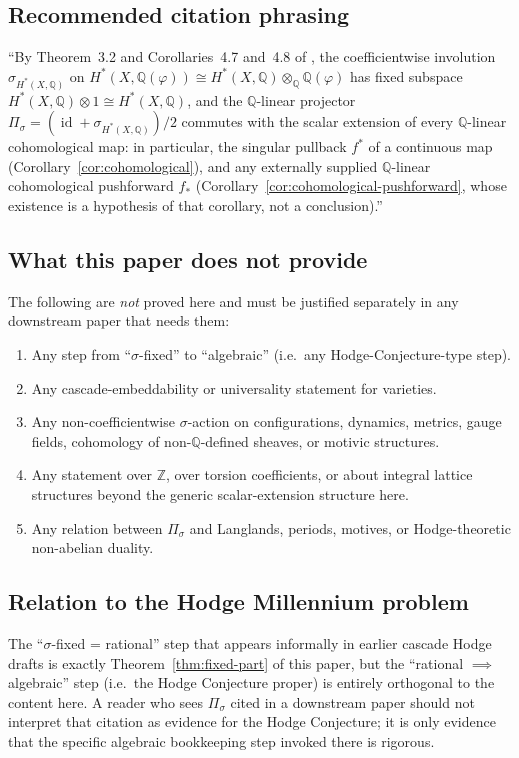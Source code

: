 \documentclass[11pt, a4paper]{amsart}
\theoremstyle{definition}
\newcommand{\Q}{\mathbb{Q}}
\newcommand{\Z}{\mathbb{Z}}
\newcommand{\id}{\operatorname{id}}
\begin{document}
\subsection{Recommended citation phrasing}

``By Theorem~3.2 and Corollaries~4.7 and~4.8 of
\cite{SigmaRationality}, the coefficientwise involution
$\sigma_{H^*(X, \Q)}$ on $H^*(X, \Q(\varphi)) \cong H^*(X, \Q)
\otimes_\Q \Q(\varphi)$ has fixed subspace $H^*(X, \Q) \otimes 1
\cong H^*(X, \Q)$, and the $\Q$-linear projector $\Pi_\sigma =
(\id + \sigma_{H^*(X, \Q)})/2$ commutes with the scalar extension
of every $\Q$-linear cohomological map: in particular, the singular
pullback $f^*$ of a continuous map (Corollary~\ref{cor:cohomological}),
and any externally supplied $\Q$-linear cohomological pushforward
$f_*$ (Corollary~\ref{cor:cohomological-pushforward}, whose
existence is a hypothesis of that corollary, not a conclusion).''

\subsection{What this paper does not provide}

The following are \emph{not} proved here and must be justified
separately in any downstream paper that needs them:

\begin{enumerate}
\item Any step from ``$\sigma$-fixed'' to ``algebraic'' (i.e.\ any
  Hodge-Conjecture-type step).
\item Any cascade-embeddability or universality statement for
  varieties.
\item Any non-coefficientwise $\sigma$-action on configurations,
  dynamics, metrics, gauge fields, cohomology of non-$\Q$-defined
  sheaves, or motivic structures.
\item Any statement over $\Z$, over torsion coefficients, or about
  integral lattice structures beyond the generic scalar-extension
  structure here.
\item Any relation between $\Pi_\sigma$ and Langlands, periods,
  motives, or Hodge-theoretic non-abelian duality.
\end{enumerate}

\subsection{Relation to the Hodge Millennium problem}

The ``$\sigma$-fixed = rational'' step that appears informally in
earlier cascade Hodge drafts is exactly
Theorem~\ref{thm:fixed-part} of this paper, but the ``rational
$\implies$ algebraic'' step (i.e.\ the Hodge Conjecture proper) is
entirely orthogonal to the content here. A reader who sees $\Pi_\sigma$ cited in a downstream paper
should not interpret that citation as evidence for the Hodge
Conjecture; it is only evidence that the specific algebraic
bookkeeping step invoked there is rigorous.
\end{document}
